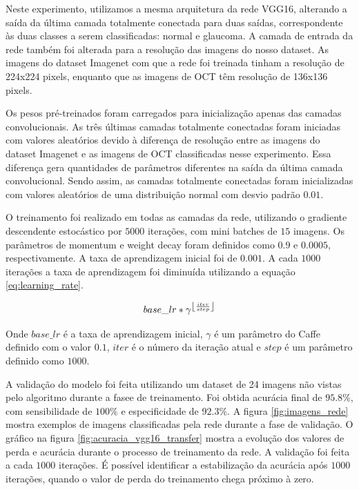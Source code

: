 \documentclass[conference]{IEEEtran}
\DeclarePairedDelimiter\floor{\lfloor}{\rfloor}
\begin{document}
  Neste experimento, utilizamos a mesma arquitetura da rede VGG16, alterando a saída da última camada totalmente conectada para duas saídas, correspondente às duas classes a serem classificadas: normal e glaucoma. A camada de entrada da rede também foi alterada para a resolução das imagens do nosso dataset. As imagens do dataset Imagenet com que a rede foi treinada tinham a resolução de 224x224 pixels, enquanto que as imagens de OCT têm resolução de 136x136 pixels.
  
  Os pesos pré-treinados foram carregados para inicialização apenas das camadas convolucionais. As três últimas camadas totalmente conectadas foram iniciadas com valores aleatórios devido à diferença de resolução entre as imagens do dataset Imagenet e as imagens de OCT classificadas nesse experimento. Essa diferença gera quantidades de parâmetros diferentes na saída da última camada convolucional. Sendo assim, as camadas totalmente conectadas foram inicializadas com valores aleatórios de uma distribuição normal com desvio padrão $0.01$.

  O treinamento foi realizado em todas as camadas da rede, utilizando o gradiente descendente estocástico por $5000$ iterações, com mini batches de $15$ imagens. Os parâmetros de momentum e weight decay foram definidos como $0.9$ e $0.0005$, respectivamente. A taxa de aprendizagem inicial foi de $0.001$. A cada $1000$ iterações a taxa de aprendizagem foi diminuída utilizando a equação \ref{eq:learning_rate}.

  \begin{equation}
    base\_lr * \gamma^{\floor*{\frac{iter}{step}}}
    \label{eq:learning_rate}
  \end{equation}

  Onde $base\_lr$ é a taxa de aprendizagem inicial, $\gamma$ é um parâmetro do Caffe definido com o valor $0.1$, $iter$ é o número da iteração atual e $step$ é um parâmetro definido como $1000$.

  A validação do modelo foi feita utilizando um dataset de 24 imagens não vistas pelo algoritmo durante a fasee de treinamento. Foi obtida acurácia final de $95.8\%$, com sensibilidade de $100\%$ e especificidade de $92.3\%$. A figura \ref{fig:imagens_rede} mostra exemplos de imagens classificadas pela rede durante a fase de validação. O gráfico na figura \ref{fig:acuracia_vgg16_transfer} mostra a evolução dos valores de perda e acurácia durante o processo de treinamento da rede. A validação foi feita a cada $1000$ iterações. É possível identificar a estabilização da acurácia após $1000$ iterações, quando o valor de perda do treinamento chega próximo à zero.
\end{document}
